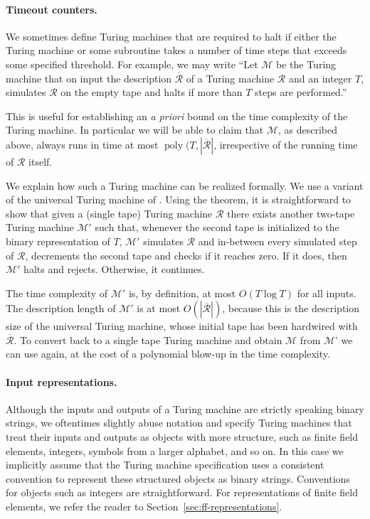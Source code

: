 \documentclass[11pt]{article}
\theoremstyle{definition}
\newcommand{\ol}[1]{\overline{#1}}
\DeclareMathOperator{\poly}{poly}
\renewcommand{\cal}[1]{\mathcal{#1}}
\begin{document}
\paragraph{Timeout counters.} We sometimes define Turing machines that are required to halt if 
either the Turing machine or some subroutine takes a number of time steps that exceeds some specified threshold. For example, we may write ``Let $\cal{M}$ be the Turing machine that on input the description $\ol{\cal{R}}$ of a Turing machine $\cal{R}$ and an integer $T$, simulates $\cal{R}$ on the empty tape and halts if more than $T$ steps are performed.''

This is useful for establishing an \emph{a priori} bound on the time complexity of the Turing machine. In particular we will be able to claim that $\cal{M}$, as described above, always runs in time at most $\poly(T,|\ol{\cal{R}}|$, irrespective of the running time of $\cal{R}$ itself.

We explain how such a Turing machine can be realized formally. We use a variant of the universal Turing machine of . Using the theorem, it is straightforward to show that given a (single tape) Turing machine $\cal{R}$ there exists another two-tape Turing machine $\cal{M}'$ such that, whenever the second tape is initialized to the binary representation of $T$, $\cal{M}'$ simulates $\cal{R}$ and in-between every simulated step of $\cal{R}$, decrements the second tape and checks if it reaches zero. If it does, then $\cal{M}'$ halts and rejects. Otherwise, it continues. 

The time complexity of $\cal{M}'$ is, by definition, at most $O(T \log T)$ for all inputs. The description length of $\cal{M}'$ is at most $O(|\ol{\cal{R}}|)$, because this is the description size of the universal Turing machine, whose initial tape has been hardwired with $\ol{\cal{R}}$.
To convert back to a single tape Turing machine and obtain $\cal{M}$ from $\cal{M}$' we can use  again, at the cost of a polynomial blow-up in the time complexity.


\paragraph{Input representations.} 
Although the inputs and outputs of a Turing machine are strictly speaking
  binary strings, we oftentimes slightly abuse notation and specify Turing
  machines that treat their inputs and outputs as objects with more structure,
  such as finite field elements, integers, symbols from a larger alphabet, and
  so on.
  In this case we implicitly assume that the Turing machine specification uses a
  consistent convention to represent these structured objects as binary strings.
  Conventions for objects such as integers are straightforward.
  For representations of finite field elements, we refer the reader to
  Section~\ref{sec:ff-representations}.
\end{document}
